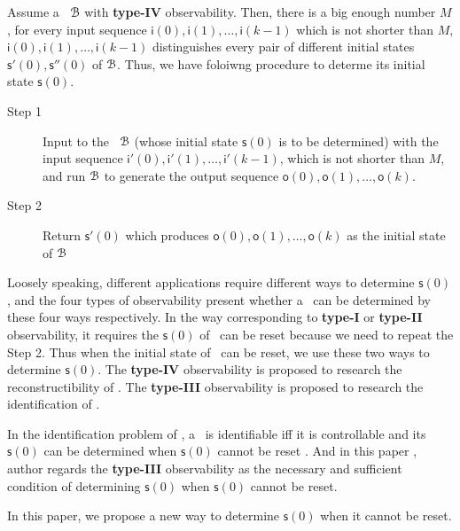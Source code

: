 Assume a \BCN\ ${\mathcal{B}}$  with {\bf type-IV}  observability. Then, there is a big enough number $M$, for every  input sequence $\mathsf{i}(0),\mathsf{i}(1),\ldots, \mathsf{i}(k-1)$ which is not shorter than $M$,  $\mathsf{i}(0),\mathsf{i}(1),\ldots, \mathsf{i}(k-1)$ distinguishes every pair of different initial states $\mathsf{s}'(0), \mathsf{s}''(0)$ of ${\mathcal{B}}$. Thus, we have foloiwng procedure to determe its initial state $\mathsf{s}(0)$.

 \begin{description}
	\item[Step 1]  Input to the \BCN\ ${\mathcal{B}}$ (whose initial state $\mathsf{s}(0)$ is to be determined) with the input sequence $\mathsf{i}'(0),\mathsf{i}'(1),\ldots, \mathsf{i}'(k-1)$,  which is not shorter than $M$, and run ${\mathcal{B}}$ to generate the output sequence $\mathsf{o}(0),\mathsf{o}(1),\ldots,\mathsf{o}(k)$.
	\item[Step 2] Return $\mathsf{s}'(0)$ which produces $\mathsf{o}(0),\mathsf{o}(1),\ldots,\mathsf{o}(k)$ as the initial state of ${\mathcal{B}}$ 
\end{description}

Loosely speaking, different applications require different ways to determine $\mathsf{s}(0)$, and the four types of observability present whether a \BCN\ can be determined by these four ways respectively. In the way corresponding to {\bf type-I} or {\bf type-II} observability, it requires the $\mathsf{s}(0)$ of \BCN\ can be reset because we need to repeat the Step 2. Thus when the initial state of \BCN\ can be reset, we use these two ways to determine $\mathsf{s}(0)$. The {\bf type-IV} observability is proposed to research the reconstructibility of \BCN. The {\bf type-III} observability is proposed to research the identification of \BCN. 

In the identification problem of \BCNs, a \BCN\ is identifiable iff it is controllable and its $\mathsf{s}(0)$ can be determined when $\mathsf{s}(0)$ cannot be reset \cite{Cheng2011Identification}. And in this paper \cite{Cheng2011Identification}, author regards the {\bf type-III} observability as the necessary and sufficient condition of determining $\mathsf{s}(0)$ when $\mathsf{s}(0)$ cannot be reset. %

In this paper, we propose a new way to determine $\mathsf{s}(0)$ when it cannot be reset.%

